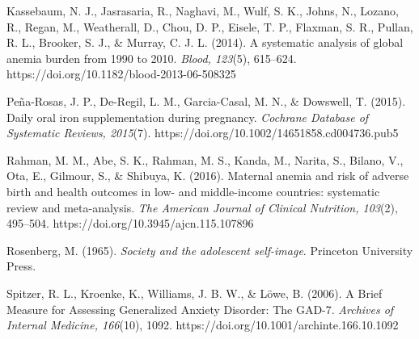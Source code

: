 \documentclass[12pt]{article}
\begin{document}
Kassebaum, N. J., Jasrasaria, R., Naghavi, M., Wulf, S. K., Johns, N., Lozano, R., Regan, M., Weatherall, D., Chou, D. P., Eisele, T. P., Flaxman, S. R., Pullan, R. L., Brooker, S. J., \& Murray, C. J. L. (2014). A systematic analysis of global anemia burden from 1990 to 2010. \textit{Blood, 123}(5), 615–624. https://doi.org/10.1182/blood-2013-06-508325

Peña-Rosas, J. P., De-Regil, L. M., Garcia-Casal, M. N., \& Dowswell, T. (2015). Daily oral iron supplementation during pregnancy. \textit{Cochrane Database of Systematic Reviews, 2015}(7). https://doi.org/10.1002/14651858.cd004736.pub5

Rahman, M. M., Abe, S. K., Rahman, M. S., Kanda, M., Narita, S., Bilano, V., Ota, E., Gilmour, S., \& Shibuya, K. (2016). Maternal anemia and risk of adverse birth and health outcomes in low- and middle-income countries: systematic review and meta-analysis. \textit{The American Journal of Clinical Nutrition, 103}(2), 495–504. https://doi.org/10.3945/ajcn.115.107896

Rosenberg, M. (1965). \textit{Society and the adolescent self-image}. Princeton University Press.

Spitzer, R. L., Kroenke, K., Williams, J. B. W., \& Löwe, B. (2006). A Brief Measure for Assessing Generalized Anxiety Disorder: The GAD-7. \textit{Archives of Internal Medicine, 166}(10), 1092. https://doi.org/10.1001/archinte.166.10.1092
\end{document}
